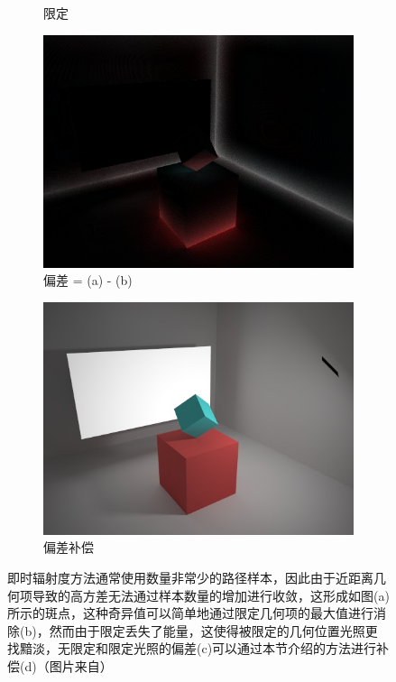 \begin{figure}
\begin{fullwidth}
\begin{subfigure}[b]{0.246\thewidth}
		\caption{限定}
	\end{subfigure}
	\begin{subfigure}[b]{0.246\thewidth}
		\includegraphics[width=1.0\textwidth]{figures/ir/vpl-difference4x}
		\caption{偏差 = (a) - (b)}
	\end{subfigure}
	\begin{subfigure}[b]{0.246\thewidth}
		\includegraphics[width=1.0\textwidth]{figures/ir/vpl-compensated}
		\caption{偏差补偿}
	\end{subfigure}
	\caption{即时辐射度方法通常使用数量非常少的路径样本，因此由于近距离几何项导致的高方差无法通过样本数量的增加进行收敛，这形成如图(a)所示的斑点，这种奇异值可以简单地通过限定几何项的最大值进行消除(b)，然而由于限定丢失了能量，这使得被限定的几何位置光照更找黯淡，无限定和限定光照的偏差(c)可以通过本节介绍的方法进行补偿(d)（图片来自\cite{u:VirtualPointLightBiasCompensation}）}
	\label{f:ir-bias}
\end{fullwidth}
\end{figure}


